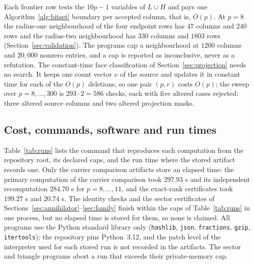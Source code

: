 \documentclass[11pt]{article}
\theoremstyle{definition}
\theoremstyle{remark}
\begin{document}
Each frontier row tests the $10p-1$ variables of $L\cup H$ and pays one
Algorithm~\ref{alg:bitset} boundary per accepted column, that is, $O(p)$. At $p=8$
the radius-one neighbourhood of the four endpoint rows has $47$ columns and $240$ rows and the
radius-two neighbourhood has $330$ columns and $1803$ rows (Section~\ref{sec:validation}).
The programs cap a neighbourhood at $1200$ columns and $20{,}000$ nonzero entries, and
a cap is reported as inconclusive, never as a refutation. The constant-time
face classification of Section~\ref{sec:projection} needs no search. It keeps one
count vector $\nu$ of the source and updates it in constant time for each of
the $O(p)$ deletions, so one pair $(p,r)$ costs $O(p)$; the sweep over $p=8,\ldots,300$ is
$293\cdot2=586$ checks, each with five altered cases rejected: three altered
source columns and two altered projection masks.

\subsection{Cost, commands, software and run times}

Table~\ref{tab:runs} lists the command that reproduces each computation from the
repository root, its declared caps, and the run time where the stored artifact
records one. Only the carrier comparison artifacts store an elapsed time: the
primary computation of the carrier comparison took $297.93$ s and its independent
recomputation $284.70$ s for $p=8,\ldots,11$, and the exact-rank certificates took
$199.27$ s and $20.74$ s. The identity checks and the sector certificates of
Sections~\ref{sec:annihilator}--\ref{sec:family} finish within the caps of
Table~\ref{tab:runs} in one process, but no elapsed time is stored for them, so none
is claimed. All programs use the Python standard library only (\texttt{hashlib},
\texttt{json}, \texttt{fractions}, \texttt{gzip}, \texttt{itertools}); the repository pins Python~3.12, and
the patch level of the interpreter used for each stored run is not recorded in the
artifacts. The sector and triangle programs abort a run that exceeds their private-memory cap.
\end{document}
